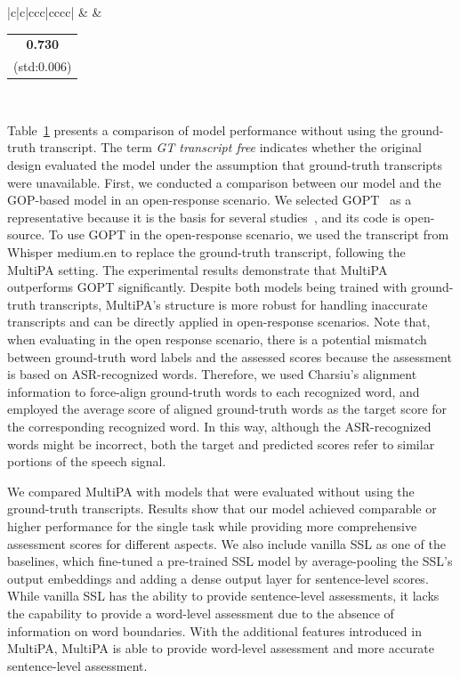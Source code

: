 \documentclass{Interspeech2024}
\begin{document}
\begin{table}
{\begin{tabular}{|c|c|ccc|cccc|}
   &
   &
  \begin{tabular}[c]{@{}c@{}}\textbf{0.730}\\ (std:0.006)\end{tabular} \\ \hline 
\end{tabular}%
}
\label{tab:system_performance}
\end{table}

Table~\ref{tab:system_performance} presents a comparison of model performance without using the ground-truth transcript. The term \emph{GT transcript free} indicates whether the original design evaluated the model under the assumption that ground-truth transcripts were unavailable. First, we conducted a comparison between our model and the GOP-based model in an open-response scenario. We selected GOPT~\cite{gong2022transformer} as a representative because it is the basis for several studies~\cite{do2023hierarchical, chao20223m, do2023score}, and its code is open-source. To use GOPT in the open-response scenario, we used the transcript from Whisper medium.en to replace the ground-truth transcript, following the MultiPA setting. The experimental results demonstrate that MultiPA outperforms GOPT significantly. Despite both models being trained with ground-truth transcripts, MultiPA's structure is more robust for handling inaccurate transcripts and can be directly applied in open-response scenarios. Note that, when evaluating in the open response scenario, there is a potential mismatch between ground-truth word labels and the assessed scores because the assessment is based on ASR-recognized words. Therefore, we used Charsiu's alignment information to force-align ground-truth words to each recognized word, and employed the average score of aligned ground-truth words as the target score for the corresponding recognized word. In this way, although the ASR-recognized words might be incorrect, both the target and predicted scores refer to similar portions of the speech signal. 

We compared MultiPA with models that were evaluated without using the ground-truth transcripts. Results show that our model achieved comparable or higher performance for the single task while providing more comprehensive assessment scores for different aspects. We also include vanilla SSL as one of the baselines, which fine-tuned a pre-trained SSL model by average-pooling the SSL’s output embeddings and adding a dense output layer for sentence-level scores. While vanilla SSL has the ability to provide sentence-level assessments, it lacks the capability to provide a word-level assessment due to the absence of information on word boundaries. With the additional features introduced in MultiPA, MultiPA is able to provide word-level assessment and more accurate sentence-level assessment. 
\end{document}
